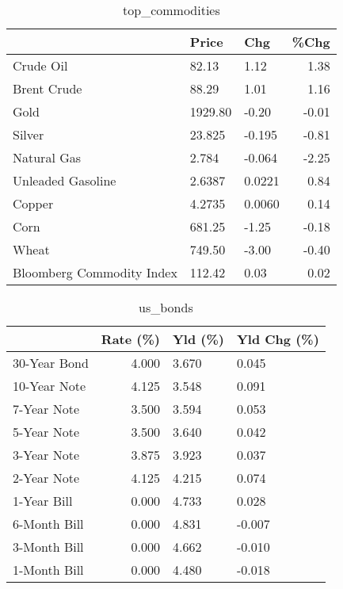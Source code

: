 \documentclass{article}%
\begin{document}
\begin{table}[htbp]%
\caption{top\_commodities}%
\centering%
\begin{adjustbox}{width=1\textwidth}%
\begin{tabular}{lllr}
\toprule
                          &   Price &    Chg &  \%Chg \\
\midrule
               Crude Oil  &   82.13 &   1.12 &  1.38 \\
             Brent Crude  &   88.29 &   1.01 &  1.16 \\
                    Gold  & 1929.80 &  -0.20 & -0.01 \\
                  Silver  &  23.825 & -0.195 & -0.81 \\
             Natural Gas  &   2.784 & -0.064 & -2.25 \\
       Unleaded Gasoline  &  2.6387 & 0.0221 &  0.84 \\
                  Copper  &  4.2735 & 0.0060 &  0.14 \\
                    Corn  &  681.25 &  -1.25 & -0.18 \\
                   Wheat  &  749.50 &  -3.00 & -0.40 \\
Bloomberg Commodity Index &  112.42 &   0.03 &  0.02 \\
\bottomrule
\end{tabular}
%
\end{adjustbox}%
\end{table}

%


\begin{table}[htbp]%
\caption{us\_bonds}%
\centering%
\begin{adjustbox}{width=1\textwidth}%
\begin{tabular}{lrll}
\toprule
             &  Rate (\%) & Yld (\%) & Yld Chg (\%) \\
\midrule
30-Year Bond &     4.000 &   3.670 &       0.045 \\
10-Year Note &     4.125 &   3.548 &       0.091 \\
 7-Year Note &     3.500 &   3.594 &       0.053 \\
 5-Year Note &     3.500 &   3.640 &       0.042 \\
 3-Year Note &     3.875 &   3.923 &       0.037 \\
 2-Year Note &     4.125 &   4.215 &       0.074 \\
 1-Year Bill &     0.000 &   4.733 &       0.028 \\
6-Month Bill &     0.000 &   4.831 &      -0.007 \\
3-Month Bill &     0.000 &   4.662 &      -0.010 \\
1-Month Bill &     0.000 &   4.480 &      -0.018 \\
\bottomrule
\end{tabular}
%
\end{adjustbox}%
\end{table}
\end{document}
